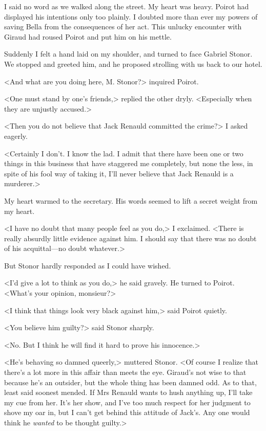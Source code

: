  I said no word as we walked along the street. My heart was heavy. Poirot had displayed his intentions only too plainly. I doubted more than ever my powers of saving Bella from the consequences of her act. This unlucky encounter with Giraud had roused Poirot and put him on his mettle. 

 Suddenly I felt a hand laid on my shoulder, and turned to face Gabriel Stonor. We stopped and greeted him, and he proposed strolling with us back to our hotel. 

 <And what are you doing here, M. Stonor?> inquired Poirot. 

 <One must stand by one's friends,> replied the other dryly. <Especially when they are unjustly accused.> 

 <Then you do not believe that Jack Renauld committed the crime?> I asked eagerly. 

 <Certainly I don't. I know the lad. I admit that there have been one or two things in this business that have staggered me completely, but none the less, in spite of his fool way of taking it, I'll never believe that Jack Renauld is a murderer.> 

 My heart warmed to the secretary. His words seemed to lift a secret weight from my heart. 

 <I have no doubt that many people feel as you do,> I exclaimed. <There is really absurdly little evidence against him. I should say that there was no doubt of his acquittal—no doubt whatever.> 

 But Stonor hardly responded as I could have wished. 

 <I'd give a lot to think as you do,> he said gravely. He turned to Poirot. <What's your opinion, monsieur?> 

 <I think that things look very black against him,> said Poirot quietly. 

 <You believe him guilty?> said Stonor sharply. 

 <No. But I think he will find it hard to prove his innocence.> 

 <He's behaving so damned queerly,> muttered Stonor. <Of course I realize that there's a lot more in this affair than meets the eye. Giraud's not wise to that because he's an outsider, but the whole thing has been damned odd. As to that, least said soonest mended. If Mrs Renauld wants to hush anything up, I'll take my cue from her. It's her show, and I've too much respect for her judgment to shove my oar in, but I can't get behind this attitude of Jack's. Any one would think he \emph{wanted} to be thought guilty.> 

